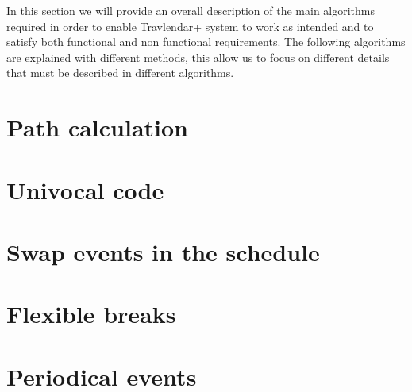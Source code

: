 In this section we will provide an overall description of the main algorithms required in order to enable Travlendar+ system to work as intended and to satisfy both functional and non functional requirements.
The following algorithms are explained with different methods, this allow us to focus on different details that must be described in different algorithms.

\section{Path calculation}
\label{sect:Path calculation}
	

\section{Univocal code}
\label{sect: Univocal code}
	

\section{Swap events in the schedule}
\label{sect: Swap events in the schedule}
	

\section{Flexible breaks}
\label{sect: Flexible breaks}
	

\section{Periodical events}
\label{sect: Periodical events}
	

